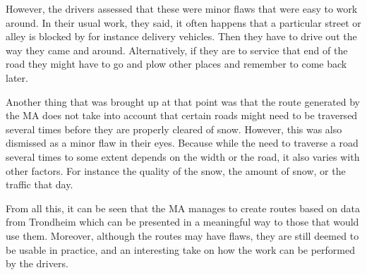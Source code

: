 However, the drivers assessed that these were minor flaws that were easy to work around. In their usual work, they said, it often happens that a particular street or alley is blocked by for instance delivery vehicles. Then they have to drive out the way they came and around. Alternatively, if they are to service that end of the road they might have to go and plow other places and remember to come back later.

Another thing that was brought up at that point was that the route generated by the MA does not take into account that certain roads might need to be traversed several times before they are properly cleared of snow. However, this was also dismissed as a minor flaw in their eyes. Because while the need to traverse a road several times to some extent depends on the width or the road, it also varies with other factors. For instance the quality of the snow, the amount of snow, or the traffic that day.

From all this, it can be seen that the MA manages to create routes based on data from Trondheim which can be presented in a meaningful way to those that would use them. Moreover, although the routes may have flaws, they are still deemed to be usable in practice, and an interesting take on how the work can be performed by the drivers.

\cleardoublepage
